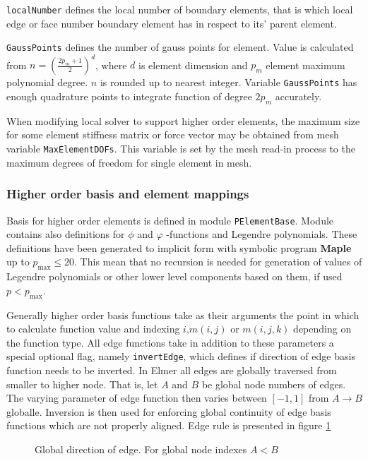 \texttt{localNumber} defines the local number of boundary elements, that is which local edge or face number boundary element has in respect to its' parent element. 

\texttt{GaussPoints} defines the number of gauss points for element. Value is calculated from $n=(\frac{2p_m+1}{2})^d$, where $d$ is element dimension and $p_m$ element maximum polynomial degree. $n$ is rounded up to nearest integer. Variable \texttt{GaussPoints} has enough quadrature points to integrate function of degree $2p_m$ accurately. 

When modifying local solver to support higher order elements, the maximum size for some element stiffness matrix or force vector may be obtained from mesh variable \texttt{MaxElementDOFs}. This variable is set by the mesh read-in process to the maximum degrees of freedom for single element in mesh.  

\subsubsection{Higher order basis and element mappings}

Basis for higher order elements is defined in module \texttt{PElementBase}. Module contains also definitions for $\phi$ and $\varphi$ -functions and Legendre polynomials. These definitions have been generated to implicit form with symbolic program \textbf{Maple} \cite{Maple} up to $p_{\max}\leq 20$. This mean that no recursion is needed for generation of values of Legendre polynomials or other lower level components based on them, if used $p<p_{\max}$. 

Generally higher order basis functions take as their arguments the point in which to calculate function value and indexing $i$,$m(i,j)$ or $m(i,j,k)$ depending on the function type. All edge functions take in addition to these parameters a special optional flag, namely \texttt{invertEdge}, which defines if direction of edge basis function needs to be inverted. In Elmer all edges are globally traversed from smaller to higher node. That is, let $A$ and $B$ be global node numbers of edges. The varying parameter of edge function then varies between $[-1,1]$ from $A \rightarrow B$ globalle. Inversion is then used for enforcing global continuity of edge basis functions which are not properly aligned.  Edge rule is presented in figure \ref{fig:parityedge}

\begin{figure}[tbhp]
\begin{center}
\label{fig:parityedge}

\end{center}
\caption{Global direction of edge. For global node indexes $A<B$}
\end{figure}


